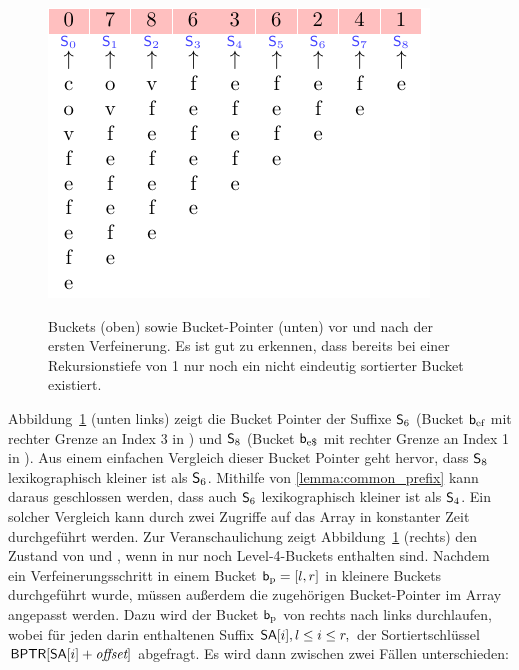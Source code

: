 \begin{figure}[ht]
{		\hspace{1em}
		\includegraphics[valign=t]{kapitel/saca_algorithmen/bpr/algorithmus/phase2/bptr_updated/image.pdf}
	}
	\caption[Buckets sowie Bucket-Pointer vor und nach der ersten Verfeinerung]{Buckets (oben) sowie Bucket-Pointer (unten) vor und nach der ersten Verfeinerung. Es ist gut zu erkennen, dass bereits bei einer Rekursionstiefe von 1 nur noch ein nicht eindeutig sortierter Bucket existiert.}
	\label{fig:buckets_compare_and_sort}
\end{figure}
Abbildung~\ref{fig:buckets_compare_and_sort} (unten links) zeigt die Bucket Pointer der Suffixe \(\mathsf{S}_{6}\) (Bucket \(\mathsf{b}_{\textup{ef}}\) mit rechter Grenze an Index 3 in \sa) und \(\mathsf{S}_{8}\) (Bucket \(\mathsf{b}_{\textup{e\$}}\) mit rechter Grenze an Index 1 in \sa). Aus einem einfachen Vergleich dieser Bucket Pointer geht hervor, dass \(\mathsf{S}_{8}\) lexikographisch kleiner ist als \(\mathsf{S}_{6}\). Mithilfe von \cref{lemma:common_prefix} kann daraus geschlossen werden, dass auch \(\mathsf{S}_{6}\) lexikographisch kleiner ist als \(\mathsf{S}_{4}\). Ein solcher Vergleich kann durch zwei Zugriffe auf das Array \bptr in konstanter Zeit durchgeführt werden. Zur Veranschaulichung zeigt Abbildung~\ref{fig:buckets_compare_and_sort} (rechts) den Zustand von \sa und \bptr, wenn in \sa nur noch Level-4-Buckets enthalten sind. Nachdem ein Verfeinerungsschritt in einem Bucket \(\mathsf{b}_{\textup{p}} = [l,r]\) in kleinere Buckets durchgeführt wurde, müssen außerdem die zugehörigen Bucket-Pointer im Array \bptr angepasst werden. Dazu wird der Bucket \(\mathsf{b}_{\textup{p}}\) von rechts nach links durchlaufen, wobei für jeden darin enthaltenen Suffix \(\sa[i], l \leq i \leq r,\) der Sortiertschlüssel \(\bptr[\sa[i]+\offset]\) abgefragt. Es wird dann zwischen zwei Fällen unterschieden:

